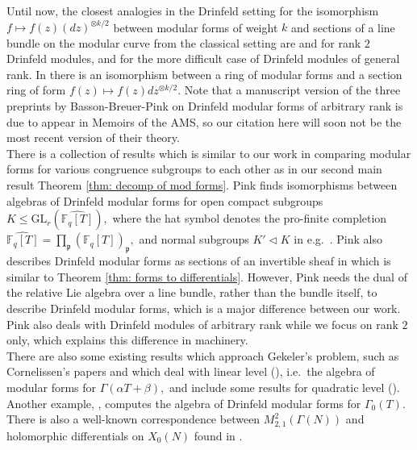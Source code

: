 \documentclass[11pt]{amsart}
\theoremstyle{definition}
\numberwithin{equation}{section}
\newcommand{\GL}{\mathrm{GL}} 	%
\newcommand{\bbF}{\mathbb{F}}		%
\newcommand{\bbP}{\mathbb{P}}		%
\begin{document}
		Until now, the closest analogies in the Drinfeld setting for the isomorphism $f\mapsto f(z)(dz)^{\otimes k/2}$ between modular forms of weight $k$ and sections of a line bundle on the modular curve from the classical setting are \cite[Proposition $5.6$]{Bockle-EichlerShimura} and \cite[Theorem $5.4$]{Gekeler-Curves} for rank $2$ Drinfeld modules, and \cite[Definition $(10.1)$]{Basson-Breuer-Pink-part2} for the more difficult case of Drinfeld modules of general rank. In \cite[Lemma $(10.7)$]{Basson-Breuer-Pink-part2} there is an isomorphism between a ring of modular forms and a section ring of form $f(z)\mapsto f(z)dz^{\otimes k/2}.$ Note that a manuscript version of the three preprints by Basson-Breuer-Pink on Drinfeld modular forms of arbitrary rank is due to appear in Memoirs of the AMS, so our citation here will soon not be the most recent version of their theory.\\ 
		
		There is a collection of results which is similar to our work in comparing modular forms for various congruence subgroups to each other as in our second main result Theorem \ref{thm: decomp of mod forms}. Pink finds isomorphisms between algebras of Drinfeld modular forms for open compact subgroups $K\leq \GL_r(\widehat{\bbF_q[T]}),$ where the hat symbol denotes the pro-finite completion $\widehat{\bbF_q[T]}=\prod_{\mathfrak{p}} (\bbF_q[T])_{\mathfrak{p}},$ and normal subgroups $K'\lhd K$ in e.g.\ \cite[Proposition $5.5$]{Pink-compactification-Drinfeld-modular-varieties-2012}. Pink also describes Drinfeld modular forms as sections of an invertible sheaf in \cite[Section $5$]{Pink-compactification-Drinfeld-modular-varieties-2012} which is similar to Theorem \ref{thm: forms to differentials}. However, Pink needs the dual of the relative Lie algebra over a line bundle, rather than the bundle itself, to describe Drinfeld modular forms, which is a major difference between our work. Pink also deals with Drinfeld modules of arbitrary rank while we focus on rank $2$ only, which explains this difference in machinery.\\
		
		There are also some existing results which approach Gekeler's problem, such as Cornelissen's papers \cite{Cornelissen-lvlT} and \cite{Cornelissen-wt1} which deal with linear level (\cite[Theorem $(3.3)$]{Cornelissen-wt1}), i.e.\ the algebra of modular forms for $\Gamma(\alpha T+\beta),$ and include some results for quadratic level (\cite[Proposition $(3.4)$]{Cornelissen-wt1}). 
		Another example, \cite[Theorem $(4.4)$]{Dalal-Kumar-Gamma_0(T)-structure}, computes the algebra of Drinfeld modular forms for $\Gamma_0(T).$ There is also a well-known correspondence between $M^2_{2,1}(\Gamma(N))$ and holomorphic differentials on $X_0(N)$ found in \cite[Section $2.10$]{Gekeler-jacobians}.\\
		
\end{document}

